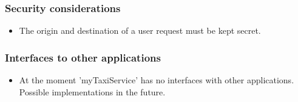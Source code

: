 \subsubsection{Security considerations}
	\begin{itemize}
		\item The origin and destination of a user request must be kept secret.
	\end{itemize}

\subsubsection{Interfaces to other applications}
	\begin{itemize}
		\item At the moment 'myTaxiService' has no interfaces with other applications. Possible implementations in the future.
	\end{itemize}